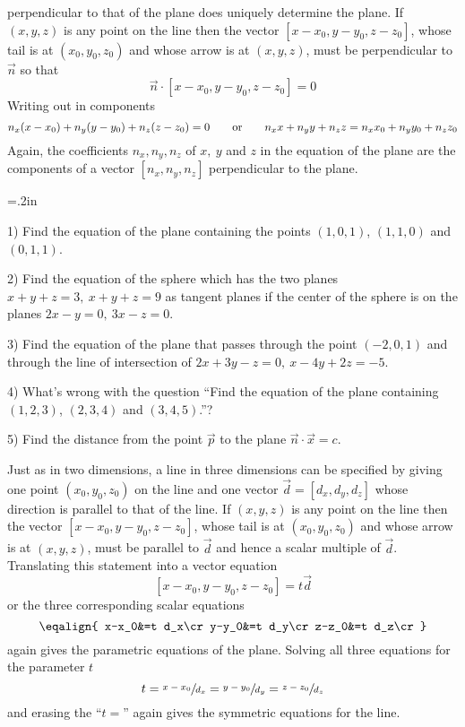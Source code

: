 perpendicular to that of the plane does uniquely determine the plane.
If $(x,y,z)$ is any point on the line then the vector $[x-x_0,y-y_0,z-z_0]$,
whose tail is at $(x_0,y_0,z_0)$ and whose arrow is at $(x,y,z)$,  must be
perpendicular to $\vec n$ so that
$$
\vec n\cdot[x-x_0,y-y_0,z-z_0]=0
$$
Writing out in components
$$
n_x(x-x_0)+n_y(y-y_0)+n_z(z-z_0)=0
\qquad\hbox{or}\qquad n_xx+n_yy+n_zz= n_xx_0+n_yy_0+n_zz_0
$$
Again, the coefficients $n_x,n_y,n_z$ of $x,\ y$ and $z$ in the equation
of the plane are the components of a vector $[n_x,n_y,n_z]$ perpendicular 
to the plane. 
\goodbreak
{}
{\parindent=.2in
\item{1)} Find the equation of the plane containing the points $(1,0,1)$,
$(1,1,0)$ and $(0,1,1)$.
\smallskip
\item{2)} Find the equation of the sphere which has the two planes
$x+y+z=3,\ x+y+z=9$ as tangent planes if the center of the sphere is on
the planes $2x-y=0,\ 3x-z=0$.
\smallskip
\item{3)} Find the equation of the plane that passes through the point
$(-2,0,1)$ and through the line of intersection of $2x+3y-z=0,\ x-4y+2z=-5$.
\smallskip
\item{4)} What's wrong with the question ``Find the equation of the plane
containing $(1,2,3)$, $(2,3,4)$ and $(3,4,5)$.''?
\smallskip
\item{5)} Find the distance from the point $\vec p$ to the plane $\vec n\cdot 
\vec x= c$.

}
Just as in two dimensions, a line in three dimensions can be specified  by
giving one point $(x_0,y_0,z_0)$ on the line and one vector 
$\vec d=[d_x,d_y,d_z]$ whose direction is parallel to that of the line.
If $(x,y,z)$ is any point on the line then the vector $[x-x_0,y-y_0,z-z_0]$,
whose tail is at $(x_0,y_0,z_0)$ and whose arrow is at $(x,y,z)$,  must be
parallel to $\vec d$ and hence a scalar multiple of $\vec d$. Translating
this statement into a vector equation
$$
[x-x_0,y-y_0,z-z_0]=t \vec d
$$
or the three corresponding scalar equations
$$\eqalign{
x-x_0&=t d_x\cr
y-y_0&=t d_y\cr
z-z_0&=t d_z\cr
}$$
again gives the parametric equations of the plane.
Solving all three equations for the parameter $t$ 
$$
t=\sfrac{x-x_0}{d_x}=\sfrac{y-y_0}{d_y}=\sfrac{z-z_0}{d_z}
$$
and erasing the ``$t=$'' again gives the symmetric equations for the line. 

